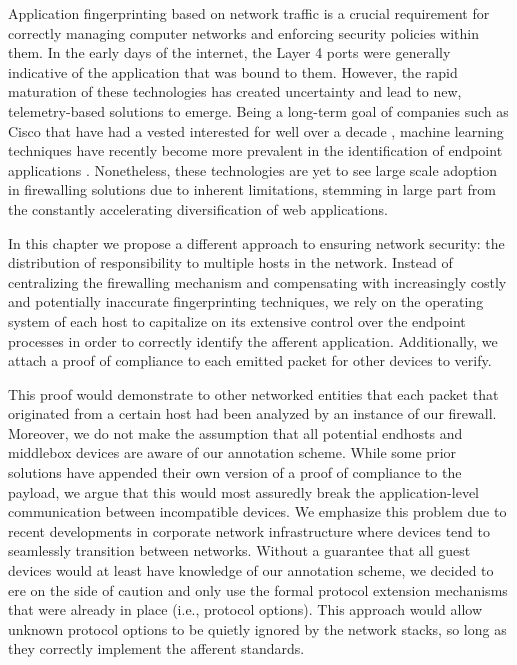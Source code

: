 Application fingerprinting based on network traffic is a crucial requirement for correctly managing computer networks and enforcing security policies within them. In the early days of the internet, the Layer 4 ports were generally indicative of the application that was bound to them. However, the rapid maturation of these technologies has created uncertainty and lead to new, telemetry-based solutions \cite{bernaille2006early} to emerge. Being a long-term goal of companies such as Cisco that have had a vested interested for well over a decade \cite{zander2005automated}, machine learning techniques have recently become more prevalent in the identification of endpoint applications \cite{yamansavascilar2017application,guerra2022datasets}. Nonetheless, these technologies are yet to see large scale adoption in firewalling solutions due to inherent limitations, stemming in large part from the constantly accelerating diversification of web applications.

In this chapter we propose a different approach to ensuring network security: the distribution of responsibility \cite{ioannidis2000implementing} to multiple hosts in the network. Instead of centralizing the firewalling mechanism and compensating with increasingly costly and potentially inaccurate fingerprinting techniques, we rely on the operating system of each host to capitalize on its extensive control over the endpoint processes in order to correctly identify the afferent application. Additionally, we attach a proof of compliance to each emitted packet for other devices to verify.

This proof would demonstrate to other networked entities that each packet that originated from a certain host had been analyzed by an instance of our firewall. Moreover, we do not make the assumption that all potential endhosts and middlebox devices are aware of our annotation scheme. While some prior solutions \cite{parno2012using,zeldovich2008securing} have appended their own version of a proof of compliance to the payload, we argue that this would most assuredly break the application-level communication between incompatible devices. We emphasize this problem due to recent developments in corporate network infrastructure \cite{ward2014beyondcorp,osborn2016beyondcorp} where devices tend to seamlessly transition between networks. Without a guarantee that all guest devices would at least have knowledge of our annotation scheme, we decided to ere on the side of caution and only use the formal protocol extension mechanisms that were already in place (i.e., protocol options). This approach would allow unknown protocol options to be quietly ignored by the network stacks, so long as they correctly implement the afferent standards.

